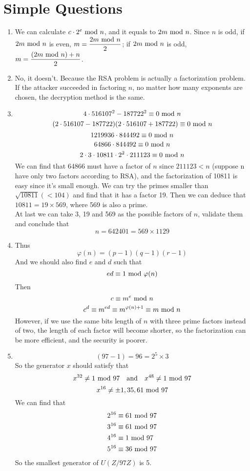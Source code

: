 \documentclass{article}
\renewcommand{\mod}{{\rm\ mod\ }}
\begin{document}
\section{Simple Questions}
\begin{enumerate}
\item
We can calculate $c\cdot 2^e\mod n$, and it equals to $2m\mod n$. Since $n$ is odd, if $2m\mod n$ is even, $m=\dfrac{2m\mod n}{2}$; if $2m\mod n$ is odd, $m=\dfrac{(2m\mod n)+n}{2}$.

\item
No, it doesn't. Because the RSA problem is actually a factorization problem. If the attacker succeeded in factoring $n$, no matter how many exponents are chosen, the decryption method is the same.

\item
$$4\cdot516107^2-187722^2\equiv0\mod n$$
$$(2\cdot516107-187722)(2\cdot516107+187722)\equiv0\mod n$$
$$1219936\cdot844492\equiv0\mod n$$
$$64866\cdot844492\equiv0\mod n$$
$$2\cdot3\cdot10811\cdot2^2\cdot211123\equiv0\mod n$$
We can find that 64866 must have a factor of $n$ since $211123<n$ (suppose n have only two factors according to RSA), and the factorization of 10811 is easy since it's small enough. We can try the primes smaller than $\sqrt{10811}(<104)$ and find that it has a factor 19. Then we can deduce that $10811=19\times569$, where 569 is also a prime.\\

At last we can take 3, 19 and 569 as the possible factors of $n$,  validate them and conclude that
$$n=642401=569\times1129$$
\item
Thus $$\varphi(n)=(p-1)(q-1)(r-1)$$
And we should also find $e$ and $d$ such that $$ed\equiv 1\mod\varphi(n)$$
Then $$c\equiv m^e\mod n$$
$$c^d\equiv m^{ed}\equiv m^{\varphi(n)+1}\equiv m\mod n$$
However, if we use the same bits length of $n$ with three prime factors instead of two, the length of each factor will become shorter, so the factorization can be more efficient, and the security is poorer.

\item
$$(97-1)=96=2^5\times3$$
So the generator $x$ should satisfy that 
$$x^{32}\neq 1\mod 97\quad{\rm and}\quad x^{48}\neq 1\mod 97$$
$$x^{16}\neq \pm 1,35,61\mod 97$$
We can find that
\begin{align*}
2^{16}&\equiv61\mod97\\
3^{16}&\equiv61\mod97\\
4^{16}&\equiv1\mod97\\
5^{16}&\equiv36\mod97
\end{align*}
So the smallest generator of $U(Z/97Z)$ is 5.


\end{enumerate}
\end{document}
